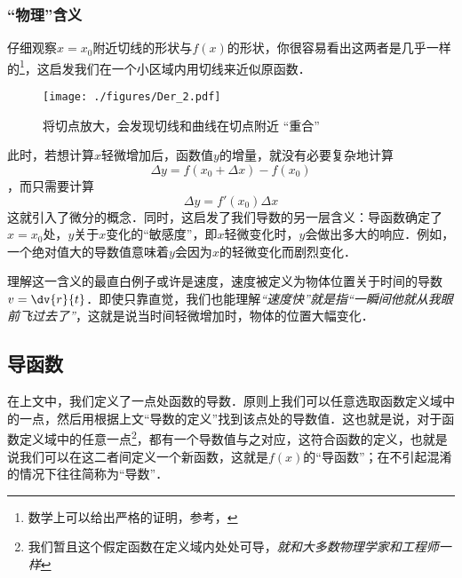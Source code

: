 \subsubsection{“物理”含义}
仔细观察$x=x_0$附近切线的形状与$f(x)$的形状，你很容易看出这两者是几乎一样的\footnote{数学上可以给出严格的证明，参考\cite{同济高}，\cite{Thomas}}，这启发我们在一个小区域内用切线来近似原函数．

\begin{figure}[ht]
\centering
\texttt{[image: ./figures/Der\_2.pdf]}
\caption{将切点放大，会发现切线和曲线在切点附近 “重合”}
\end{figure}

此时，若想计算$x$轻微增加后，函数值$y$的增量，就没有必要复杂地计算
$$\Delta y = f(x_0+\Delta x) - f(x_0)$$
，而只需要计算
\begin{equation}
\Delta y = f'(x_0) \Delta x
\end{equation}
这就引入了微分的概念．同时，这启发了我们导数的另一层含义：导函数确定了$x=x_0$处，$y$关于$x$变化的“敏感度”，即$x$轻微变化时，$y$会做出多大的响应．例如，一个绝对值大的导数值意味着$y$会因为$x$的轻微变化而剧烈变化．

理解这一含义的最直白例子或许是速度，速度被定义为物体位置关于时间的导数$v=\dv{r}{t}$．即使只靠直觉，我们也能理解\textsl{“速度快”就是指“一瞬间他就从我眼前飞过去了”}，这就是说当时间轻微增加时，物体的位置大幅变化．



\subsection{导函数}
在上文中，我们定义了一点处函数的导数．原则上我们可以任意选取函数定义域中的一点，然后用根据上文“导数的定义”找到该点处的导数值．这也就是说，对于函数定义域中的任意一点\footnote{我们暂且这个假定函数在定义域内处处可导，\textsl{就和大多数物理学家和工程师一样}}，都有一个导数值与之对应，这符合函数的定义，也就是说我们可以在这二者间定义一个新函数，这就是$f(x)$的“导函数”；在不引起混淆的情况下往往简称为“导数”．

